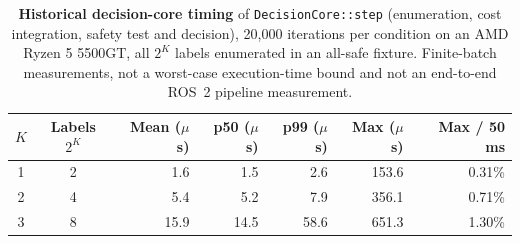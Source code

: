\begin{table}[t]
\centering
\caption{\textbf{Historical decision-core timing} of \texttt{DecisionCore::step} (enumeration, cost integration, safety test and decision), 20{,}000 iterations per condition on an AMD Ryzen 5 5500GT, all $2^K$ labels enumerated in an all-safe fixture. Finite-batch measurements, not a worst-case execution-time bound and not an end-to-end ROS~2 pipeline measurement.}
\label{tab:latency}
\small
\begin{tabular}{ccrrrrr}
\toprule
$K$ & Labels $2^K$ & Mean ($\mu$s) & p50 ($\mu$s) & p99 ($\mu$s) & Max ($\mu$s) & Max / 50 ms \\
\midrule
1 & 2 & 1.6 & 1.5 & 2.6 & 153.6 & 0.31\% \\
2 & 4 & 5.4 & 5.2 & 7.9 & 356.1 & 0.71\% \\
3 & 8 & 15.9 & 14.5 & 58.6 & 651.3 & 1.30\% \\
\bottomrule
\end{tabular}
\end{table}
